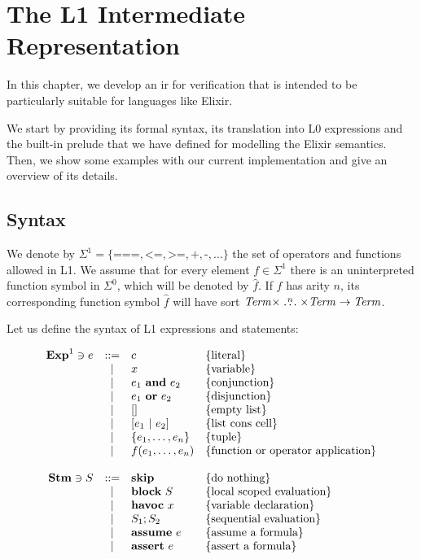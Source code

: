 \chapter{The L1 Intermediate Representation}
\label{cap:intermediateRepresentation}


In this chapter, we develop an \gls{ir} for verification that is intended to be 
particularly suitable for languages like Elixir.

We start by providing its formal syntax, its translation into L0 expressions and
the built-in prelude that we have defined for modelling the Elixir semantics.
Then, we show some examples with our current implementation and give an overview
of its details.

\section{Syntax}

We denote by $\Sigma^{1} = \{ \texttt{===}, \texttt{<=}, \texttt{>=}, 
\texttt{+}, \texttt{-}, \dots \}$ the set of operators and functions allowed in
L1. We assume that for every element $f \in \Sigma^{1}$ there is an 
uninterpreted function symbol in $\Sigma^{0}$, which will be denoted by 
$\widehat{f}$. If $f$ has arity $n$, its corresponding function symbol 
$\widehat{f}$ will have sort $\mathit{Term} \times \stackrel{n}{\dots} \times \mathit{Term}
\rightarrow \mathit{Term}$.

Let us define the syntax of L1 expressions and statements:

\[
\begin{array}{rcll}
\mathbf{Exp}^{1} \ni e & ::= & c & \{ \textrm{literal} \}\\
& | & x & \{ \textrm{variable} \}\\
& | & e_1~\textbf{and}~e_2 & \{ \textrm{conjunction} \}\\
& | & e_1~\textbf{or}~e_2 & \{ \textrm{disjunction} \}\\
& | & [] & \{ \textrm{empty list} \}\\
& | & [e_1~|~e_2] & \{ \textrm{list cons cell} \}\\
& | & \{e_1, \ldots, e_n\} & \{ \textrm{tuple} \}\\
& | & f(e_1, \ldots, e_n) & \{ \textrm{function or operator application} \}\\

\\
\mathbf{Stm} \ni S & ::= & \textbf{skip} & \{ \textrm{do nothing} \} \\
 & | & \textbf{block}~S & \{ \textrm{local scoped evaluation} \}\\
 & | & \textbf{havoc}~x & \{ \textrm{variable declaration} \}\\
 & | & S_1;S_2 & \{ \textrm{sequential evaluation} \}\\
 & | & \textbf{assume}~e & \{ \textrm{assume a formula} \}\\
 & | & \textbf{assert}~e & \{ \textrm{assert a formula} \}\\
\end{array}
\]

